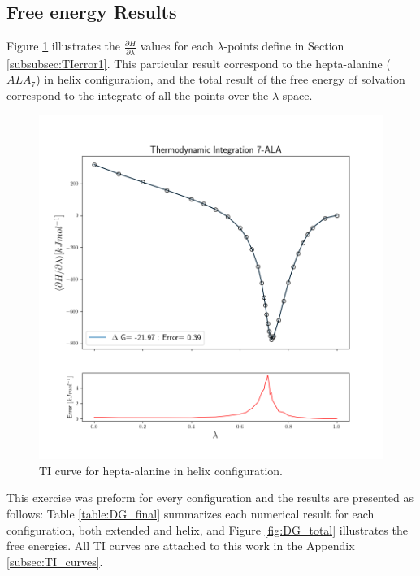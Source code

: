 \subsection{Free energy Results}
Figure \ref{fig:TI_7ALA} illustrates the $\frac{\partial H}{\partial \lambda}$ values for each $\lambda$-points define in Section \ref{subsubsec:TIerror1}. This particular result correspond to the hepta-alanine ($ALA_7$) in helix configuration, and the total result of the free energy of solvation correspond to the integrate of all the points over the $\lambda$ space. 
\begin{figure}[h!]
    \centering
    \includegraphics[scale=0.6]{Figures/Chapter_6/TI.png}
    \caption{TI curve for hepta-alanine in helix configuration.}
    \label{fig:TI_7ALA}
\end{figure}
This exercise was preform for every configuration and the results are presented as follows: Table \ref{table:DG_final} summarizes each numerical result for each configuration, both extended and helix, and Figure \ref{fig:DG_total} illustrates the free energies. All TI curves are attached to this work in the Appendix \ref{subsec:TI_curves}.


